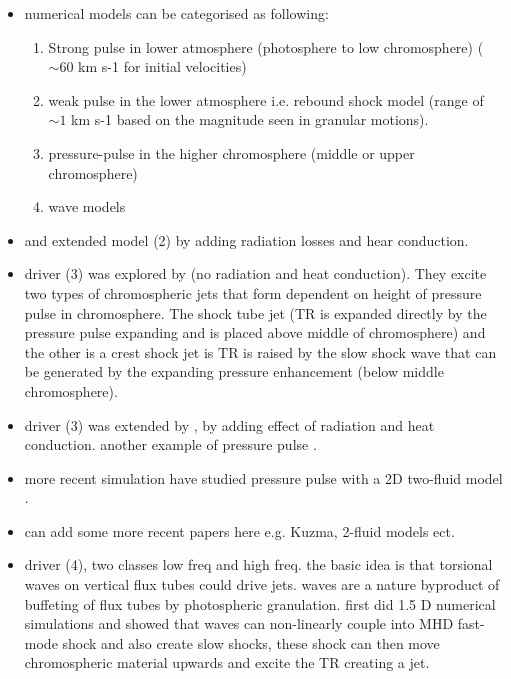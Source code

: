 \begin{itemize}
\item numerical models can be categorised as following: 
\begin{enumerate}
\item Strong pulse in lower atmosphere (photosphere to low chromosphere) ($\sim 60$ km s-1 for initial velocities)
\item weak pulse in the lower atmosphere i.e. rebound shock model (range of $\sim 1$ km s-1 based on the magnitude seen in granular motions). 
\item pressure-pulse in the higher chromosphere (middle or upper chromosphere)
\item \Alfven wave models 
\end{enumerate}
\item \cite{Sterling1990ApJ349647S} and \cite{Cheng1992AA266537C} extended model (2) by adding radiation losses and hear conduction. 
\item driver (3) was explored by \cite{Shibata1982} (no radiation and heat conduction). They excite two types of chromospheric jets that form dependent on height of pressure pulse in chromosphere. The shock tube jet (TR is expanded directly by the pressure pulse expanding and is placed above middle of chromosphere) and the other is a crest shock jet is TR is raised by the slow shock wave that can be generated by the expanding pressure enhancement (below middle chromosphere). 
\item driver (3) was extended by \cite{Sterling1990ApJ349647S,Sterling1993ApJ407778S,Cheng1992AA266537C,Heggland2007ApJ6661277H,kuzma2017AA597A133K}, by adding effect of radiation and heat conduction. another example of pressure pulse \cite{Smirnova2016SoPh2913207S}. 
\item more recent simulation have studied pressure pulse with a 2D two-fluid model \cite{kuzma2017ApJ84978K}.   
\item can add some more recent papers here e.g. Kuzma, 2-fluid models ect.
\item driver (4), two classes low freq and high freq. the basic idea is that torsional \Alfven waves on vertical flux tubes could drive jets. \Alfven waves are a nature byproduct of buffeting of flux tubes by photospheric granulation. \cite{Hollweg1982SoPh7535H,Hollweg1992ApJ389731H} first did 1.5 D numerical simulations and showed that \Alfven waves can non-linearly couple into MHD fast-mode shock and also create slow shocks, these shock can then move chromospheric material upwards and excite the TR creating a jet. 

\end{itemize}
